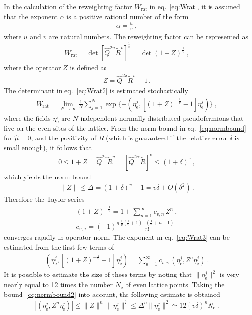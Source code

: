 \documentclass[11pt,fleqn]{article}
\newcommand{\R}{\tilde{R}}
\begin{document}
In the calculation of the reweighting factor $W_\text{rat}$ in eq.~\eqref{eq:Wrat}, it is assumed that the exponent $\alpha$ is a positive rational number of the form
\begin{gather}
   \alpha = \frac{u}{v} \ ,
\end{gather}
where $u$ and $v$ are natural numbers. The reweighting factor can be represented as
\begin{gather}
   W_\text{rat} = \det [ \hat{Q}^{2u} \R^v ]^{\frac{1}{v}}
   =
   \det (1 + Z)^{\frac{1}{v}} \ ,
   \label{eq:Wrat2}
\end{gather}
where the operator $Z$ is defined as
\begin{gather}
   Z = \hat{Q}^{2u} \R^v - 1 \ .
\end{gather}
The determinant in eq.~\eqref{eq:Wrat2} is estimated stochastically
\begin{gather}
   W_\text{rat} = \lim_{N \to \infty} \frac{1}{N} \sum_{j=1}^N \exp \{ - ( \eta^j_\text{e} , [ (1 + Z)^{-\frac{1}{v}} - 1 ] \eta^j_\text{e} ) \}
   \ ,
   \label{eq:Wrat3}
\end{gather}
where the fields $\eta^j_\text{e}$ are $N$ independent normally-distributed pseudofermions that live on the even sites of the lattice. From the norm bound in eq.~\eqref{eq:normbound} for $\hat{\mu}=0$, and the positivity of $\R$ (which is guaranteed if the relative error $\delta$ is small enough), it follows that
\begin{gather}
   0 \le 1+Z = \hat{Q}^{2u} \R^v = [ \hat{Q}^{2\alpha} \R]^v \le (1 + \delta)^v \ ,
\end{gather}
which yields the norm bound
\begin{gather}
   \| Z \| \le \Delta = (1 + \delta)^v - 1 = v \delta + O(\delta^2) \ .
   \label{eq:normbound2}
\end{gather}
Therefore the Taylor series
\begin{gather}
   (1 + Z)^{-\frac{1}{v}} = 1 + \sum_{n=1}^\infty c_{v,n} \, Z^n \ , \\
   c_{v,n} = (-1)^n \frac{\tfrac{1}{v} (\tfrac{1}{v}+1) \cdots (\tfrac{1}{v} + n - 1)}{n!}
\end{gather}
converges rapidly in operator norm. The exponent in eq.~\eqref{eq:Wrat3} can be estimated from the first few terms of
\begin{gather}
   ( \eta^j_\text{e} , [ (1 + Z)^{-\frac{1}{v}} - 1 ] \eta^j_\text{e} ) = \sum_{n=1}^\infty
   c_{v,n} \, ( \eta^j_\text{e} , Z^n \eta^j_\text{e} )  \ .
\end{gather}
It is possible to estimate the size of these terms by noting that $\| \eta^j_\text{e} \|^2$ is very nearly equal to 12 times the number $N_\text{e}$ of even lattice points. Taking the bound~\eqref{eq:normbound2} into account, the following estimate is obtained
\begin{gather}
   | ( \eta^j_\text{e} , Z^n \eta^j_\text{e} ) | \le \| Z \|^n \, \| \eta^j_\text{e} \|^2
   \le
   \Delta^n \| \eta^j_\text{e} \|^2
   \simeq
   12 (v \delta)^n N_\text{e}
   \ .
\end{gather}
\end{document}
